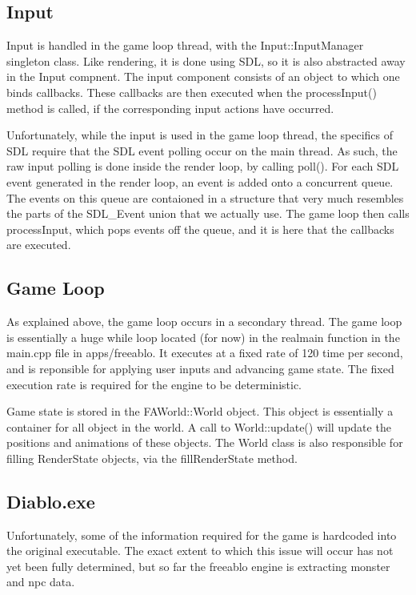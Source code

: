     \subsection{Input}
    Input is handled in the game loop thread, with the Input::InputManager singleton class. Like rendering, it is done using SDL, so it is also abstracted away in the Input compnent.
    The input component consists of an object to which one binds callbacks. These callbacks are then executed when the processInput() method is called, if the corresponding input actions have occurred.
  	
  	Unfortunately, while the input is used in the game loop thread, the specifics of SDL require that the SDL event polling occur on the main thread. As such, the raw input polling is done inside the render loop, by calling poll(). 
  	For each SDL event generated in the render loop, an event is added onto a concurrent queue. The events on this queue are contaioned in a structure that very much resembles the parts of the SDL\_Event union that we actually use.
  	The game loop then calls processInput, which pops events off the queue, and it is here that the callbacks are executed.

\subsection{Game Loop}
	As explained above, the game loop occurs in a secondary thread. The game loop is essentially a huge while loop  located (for now) in the realmain function in the main.cpp file in apps/freeablo.
	It executes at a fixed rate of 120 time per second, and is reponsible for applying user inputs and advancing game state. The fixed execution rate is required for the engine to be deterministic.
	
	Game state is stored in the FAWorld::World object. This object is essentially a container for all object in the world. A call to World::update() will update the positions and animations of these objects.
	The World class is also responsible for filling RenderState objects, via the fillRenderState method.
	
\subsection{Diablo.exe}
	Unfortunately, some of the information required for the game is hardcoded into the original executable.
	The exact extent to which this issue will occur has not yet been fully determined, but so far the freeablo engine is extracting monster and npc data.
	
